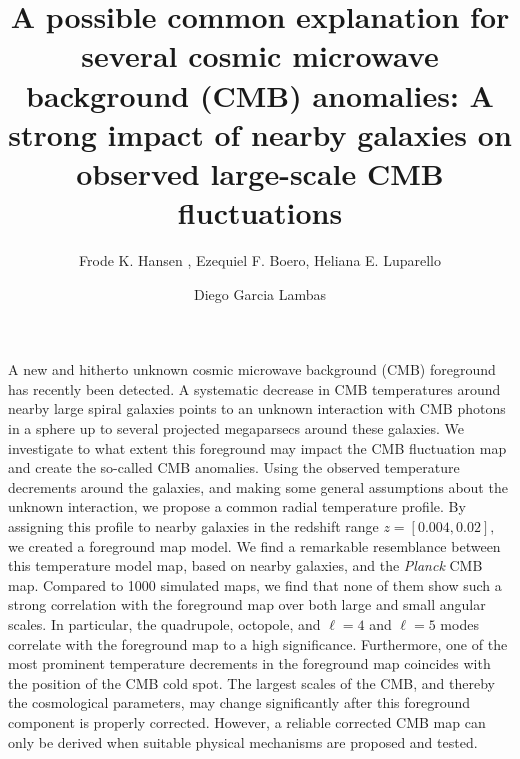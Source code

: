 \documentclass{aa}
\begin{document}
 


\title{A possible common explanation for several cosmic microwave background (CMB) anomalies: A strong impact of nearby galaxies on observed large-scale CMB  fluctuations}

   \author{Frode K. Hansen , Ezequiel F. Boero, Heliana E. Luparello \and Diego Garcia Lambas}



 \abstract
     {A new and hitherto unknown cosmic microwave background (CMB) foreground has recently been detected. A systematic decrease in CMB temperatures around nearby large spiral galaxies points to an unknown interaction with CMB photons in a sphere up to several projected megaparsecs around these galaxies.}
     {We investigate to what extent this foreground may impact the CMB fluctuation map and create the so-called CMB anomalies.}
     {Using the observed temperature decrements around the galaxies, and making some general assumptions about the unknown interaction, we propose a common radial temperature profile. By assigning this profile to nearby galaxies in the redshift range $z=[0.004,0.02],$ we created a foreground map model.}
     {We find a remarkable resemblance between this temperature model map, based on nearby galaxies, and the \textit{Planck} CMB map. Compared to 1000 simulated maps, we find that none of them show such a strong correlation with the foreground map over both large and small angular scales. In particular, the quadrupole, octopole, and $\ell=4$ and $\ell=5$ modes correlate with the foreground map to a high significance. Furthermore, one of the most prominent temperature decrements in the foreground map coincides with the position of the CMB cold spot.}
     {The largest scales of the CMB, and thereby the cosmological parameters, may change significantly after this foreground component  is properly corrected. However, a reliable corrected CMB map can only be derived when suitable physical mechanisms are proposed and tested.}

 
\end{document}
